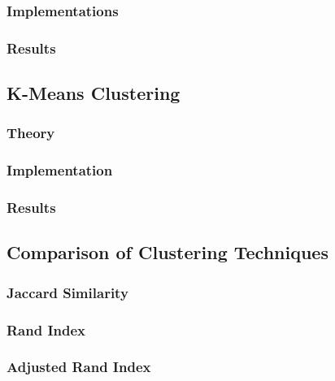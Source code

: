 \documentclass[12pt]{article}
\begin{document}
\subsubsection{Implementations}

\subsubsection{Results}

\subsection{K-Means Clustering}
\subsubsection{Theory}

\subsubsection{Implementation}

\subsubsection{Results}

\subsection{Comparison of Clustering Techniques}
\subsubsection{Jaccard Similarity}

\subsubsection{Rand Index}

\subsubsection{Adjusted Rand Index}

\newpage



\end{document}
